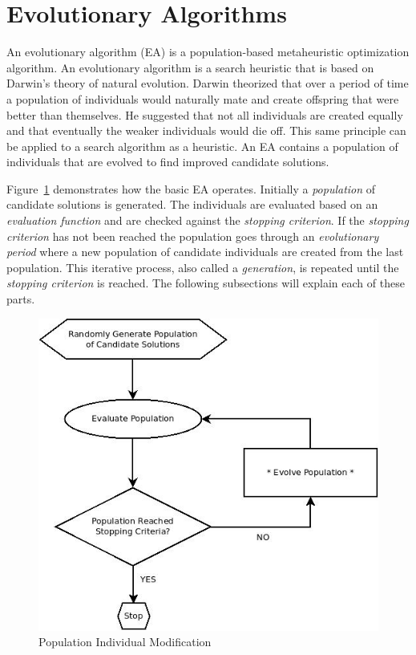 \section{Evolutionary Algorithms}
\label{sec:ea}

An evolutionary algorithm (EA) is a population-based metaheuristic optimization algorithm. An evolutionary algorithm is a search heuristic that is based on Darwin's theory of natural evolution. Darwin theorized that over a period of time a population of individuals would naturally mate and create offspring that were better than themselves. He suggested that not all individuals are created equally and that eventually the weaker individuals would die off. This same principle can be applied to a search algorithm as a heuristic. An EA contains a population of individuals that are evolved to find improved candidate solutions.

Figure~\ref{fig:evolutionaryFlowchart} demonstrates how the basic EA operates. Initially a \textit{population} of candidate solutions is generated. The individuals are evaluated based on an \textit{evaluation function} and are checked against the \textit{stopping criterion}. If the \textit{stopping criterion} has not been reached the population goes through an \textit{evolutionary period} where a new population of candidate individuals are created from the last population. This iterative process, also called a \textit{generation}, is repeated until the \textit{stopping criterion} is reached. The following subsections will explain each of these parts.

\begin{figure}[H]
	\centering
	\includegraphics[bb=0 0 524 481,scale=0.5]{figures/EA.jpeg}
	\caption{Population Individual Modification}
	\label{fig:evolutionaryFlowchart}
\end{figure}

